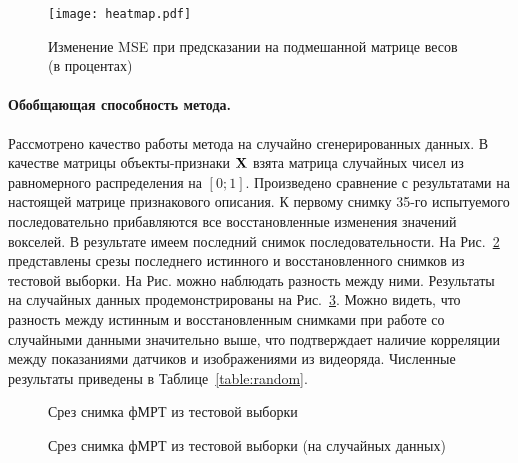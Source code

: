 \documentclass[a4paper, 12pt]{extarticle}
\begin{document}
\begin{figure}[h!]
	\centering
	\texttt{[image: heatmap.pdf]}
	\caption{Изменение MSE при предсказании на подмешанной матрице весов (в процентах)}
	\label{fig:heatmap}
\end{figure}

\paragraph*{Обобщающая способность метода.}

Рассмотрено качество работы метода на случайно сгенерированных данных. 
В качестве матрицы объекты-признаки $\mathbf{X}$ взята матрица 
случайных чисел из равномерного распределения на $[0; 1]$.
Произведено сравнение с результатами на настоящей матрице признакового описания.
К первому снимку 35-го испытуемого последовательно прибавляются все восстановленные
изменения значений вокселей.
В результате имеем последний снимок последовательности. На Рис.~\ref*{fig:recover}
представлены срезы последнего истинного и восстановленного снимков из тестовой выборки.
На Рис. можно наблюдать разность между ними.
Результаты на случайных данных продемонстрированы на Рис.~\ref*{fig:random}.
Можно видеть, что разность между истинным и восстановленным снимками при работе со случайными данными
значительно выше, что подтверждает наличие корреляции между показаниями датчиков и
изображениями из видеоряда. Численные результаты приведены в Таблице~\ref{table:random}.

\begin{figure}[h!]
	\centering
	\hfill
	\hfill
	\caption{Срез снимка фМРТ из тестовой выборки}
	\label{fig:recover}
\end{figure}

\begin{figure}[h!]
	\centering
	\hfill
	\hfill
	\caption{Срез снимка фМРТ из тестовой выборки (на случайных данных)}
	\label{fig:random}
\end{figure}
\end{document}
